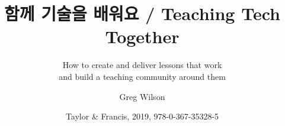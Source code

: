 \documentclass[nemilov1]{../tex/Nemilov}
\begin{document}
\title{함께 기술을 배워요 / Teaching Tech Together}
\subtitle{How to create and deliver lessons that work\\ and build a teaching community around them}
\author{Greg Wilson}
\date{Taylor \& Francis, 2019, 978-0-367-35328-5}
\maketitle

\frontmatter

\tableofcontents


\mainmatter

% 
% 
% 
% 
% 
% 
% 
% 
% 
% 
% 
% 
% 


\cleardoublepage

\printbibliography

\appendix
% 
% 
% 
% 
% 
% 
% 
% 


\printindex
\end{document}
